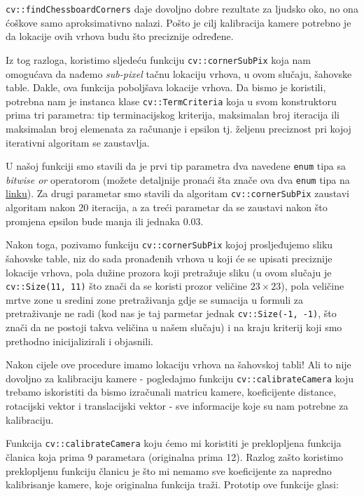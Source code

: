 \documentclass[a4paper, 12pt]{article}
\begin{document}
\lstinline{cv::findChessboardCorners} daje dovoljno dobre rezultate za ljudsko oko, no ona ćoškove samo aproksimativno nalazi. Pošto je cilj kalibracija kamere potrebno je da lokacije ovih vrhova budu što preciznije određene.

Iz tog razloga, koristimo sljedeću funkciju \lstinline{cv::cornerSubPix} koja nam omogućava da nađemo \textit{sub-pixel} tačnu lokaciju vrhova, u ovom slučaju, šahovske table. Dakle, ova funkcija poboljšava lokacije vrhova. Da bismo je koristili, potrebna nam je instanca klase \lstinline{cv::TermCriteria} koja u svom konstruktoru prima tri parametra: tip terminacijskog kriterija, maksimalan broj iteracija ili maksimalan broj elemenata za računanje i epsilon tj. željenu preciznost pri kojoj iterativni algoritam se zaustavlja.

U našoj funkciji smo stavili da je prvi tip parametra dva navedene \lstinline{enum} tipa sa \textit{bitwise or} operatorom (možete detaljnije pronaći šta znače ova dva \lstinline{enum} tipa na \href{https://docs.opencv.org/4.x/d9/d5d/classcv_1_1TermCriteria.html#a56fecdc291ccaba8aad27d67ccf72c57}{linku}). Za drugi parametar smo stavili da algoritam \lstinline{cv::cornerSubPix} zaustavi algoritam nakon 20 iteracija, a za treći parametar da se zaustavi nakon što promjena epsilon bude manja ili jednaka 0.03.

Nakon toga, pozivamo funkciju \lstinline{cv::cornerSubPix} kojoj prosljeđujemo sliku šahovske table, niz do sada pronađenih vrhova u koji će se upisati preciznije lokacije vrhova, pola dužine prozora koji pretražuje sliku (u ovom slučaju je \lstinline{cv::Size(11, 11)} što znači da se koristi prozor veličine $23 \times 23$), pola veličine mrtve zone u sredini zone pretraživanja gdje se sumacija u formuli za pretraživanje ne radi (kod nas je taj parmetar jednak \lstinline{cv::Size(-1, -1)}, što znači da ne postoji takva veličina u našem slučaju) i na kraju kriterij koji smo prethodno inicijalizirali i objasnili.

Nakon cijele ove procedure imamo lokaciju vrhova na šahovskoj tabli! Ali to nije dovoljno za kalibraciju kamere - pogledajmo funkciju \lstinline{cv::calibrateCamera} koju trebamo iskoristiti da bismo izračunali matricu kamere, koeficijente distance, rotacijski vektor i translacijski vektor - sve informacije koje su nam potrebne za kalibraciju.

Funkcija \lstinline{cv::calibrateCamera} koju ćemo mi koristiti je preklopljena funkcija članica koja prima 9 parametara (originalna prima 12). Razlog zašto koristimo preklopljenu funkciju članicu je što mi nemamo sve koeficijente za napredno kalibrisanje kamere, koje originalna funkcija traži. Prototip ove funkcije glasi:
\end{document}

